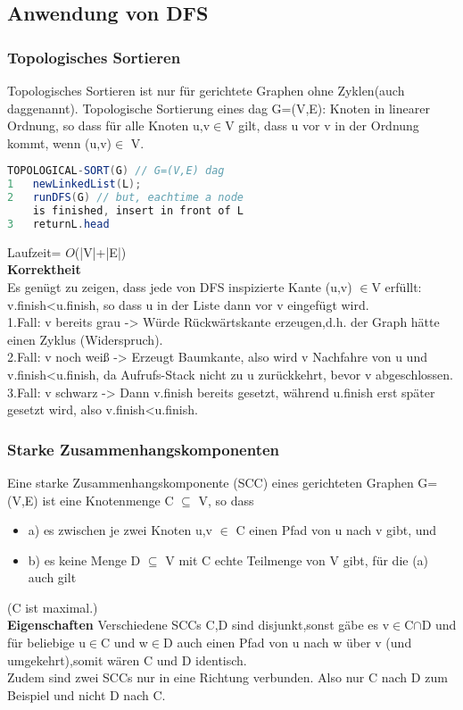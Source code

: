 \documentclass[jou,apacite]{apa6}
\begin{document}
\subsection{Anwendung von DFS}
\subsubsection{Topologisches Sortieren}
Topologisches Sortieren ist nur für gerichtete Graphen ohne Zyklen(auch \dq dag\dq  genannt). Topologische Sortierung eines dag G=(V,E): Knoten in linearer Ordnung, so dass für alle Knoten u,v$\in$V gilt, dass u vor v in der Ordnung kommt, wenn (u,v)$\in$ V.
\begin{lstlisting}[language=java]
TOPOLOGICAL-SORT(G) // G=(V,E) dag
1   newLinkedList(L);
2   runDFS(G) // but, eachtime a node 
    is finished, insert in front of L 
3   returnL.head
\end{lstlisting}
Laufzeit= $O$(|V|+|E|)\\
{\bfseries Korrektheit }\\ 
Es genügt zu zeigen, dass jede von DFS inspizierte Kante (u,v) $\in$V erfüllt: v.finish<u.finish, so dass u in der Liste dann vor v eingefügt wird.\\
1.Fall: v bereits grau -> Würde Rückwärtskante erzeugen,d.h. der Graph hätte einen Zyklus (Widerspruch). \\
2.Fall: v noch weiß -> Erzeugt Baumkante, also wird v Nachfahre von u und v.finish<u.finish, da Aufrufs-Stack nicht zu u zurückkehrt, bevor v abgeschlossen. \\
3.Fall: v schwarz -> Dann v.finish bereits gesetzt, während u.finish erst später gesetzt wird, also v.finish<u.finish.\\

\subsubsection{Starke Zusammenhangskomponenten}
Eine starke Zusammenhangskomponente (SCC) eines gerichteten Graphen G=(V,E) ist eine Knotenmenge C $\subseteq$ V, 
so dass\\
\begin{itemize}
    \item a) es zwischen je zwei Knoten u,v $\in$ C einen Pfad von u nach v gibt, und 
    \item b) es keine Menge D $\subseteq$ V mit C echte Teilmenge von V gibt, für die (a) auch gilt
\end{itemize}
(C ist maximal.)\\
{\bfseries Eigenschaften}
Verschiedene SCCs C,D sind disjunkt,sonst gäbe es  v$\in$C$\cap$D und für beliebige  u$\in$C und  w$\in$D auch einen Pfad von u nach w über v (und umgekehrt),somit wären C und D identisch.\\
Zudem sind zwei SCCs nur in eine Richtung verbunden. Also nur C nach D zum Beispiel und nicht D nach C.\\
\end{document}
